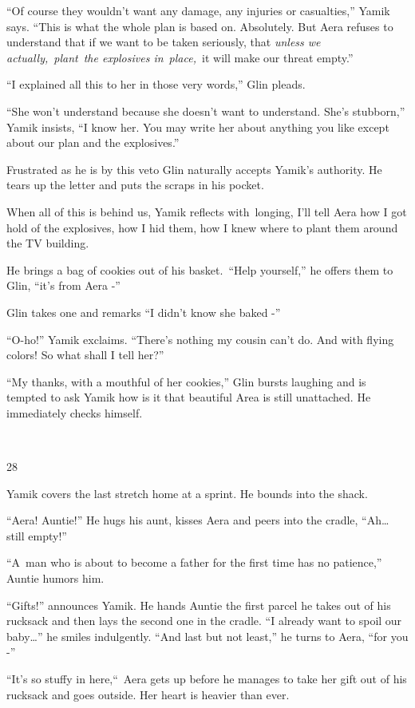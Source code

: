 \documentclass[twoside,11pt]{book}
\begin{document}
``Of course they wouldn't want any damage, any injuries or casualties,'' Yamik says.
``This is what the whole plan is based on. Absolutely. But Aera refuses to understand that if we want to
be taken seriously, that \textit{unless we actually,}\ \textit{plant}\ \textit{the explosives in}\ \textit{place,\ }it
will make our threat empty.'' \ 

``I explained all this to her in those very words,'' Glin pleads. 

``She won't understand because she doesn't want to understand. She's stubborn,'' Yamik insists, ``I know
her. You may write her about anything you like except about our plan and the explosives.'' 

Frustrated as he is by this veto Glin naturally accepts Yamik's authority. He tears up the letter and puts the scraps in
his pocket. 

When all of this is behind us, Yamik reflects with~longing, I'll tell Aera how I got hold of the explosives, how I hid
them, how I knew where to plant them around the TV building.

He brings a bag of cookies out of his basket.\ ``Help yourself,'' he offers them to Glin,
``it's from Aera -'' 

Glin takes one and remarks ``I didn't know she baked -''

``O-ho!'' Yamik exclaims. ``There's nothing my cousin can't do. And with flying
colors! So what shall I tell her?'' 

``My thanks, with a mouthful of her cookies,'' Glin bursts laughing and is tempted to ask
Yamik how is it that beautiful Area is still unattached. He immediately checks himself.

~

28~~~~~~~~~~~~~ 

Yamik covers the last stretch home at a sprint. He bounds into the shack. 

``Aera! Auntie!'' He hugs his aunt, kisses Aera and peers into the cradle,
``Ah{\dots} still empty!'' 

``A~man who is about to become a father for the first time has no patience,'' Auntie humors
him. 

``Gifts!'' announces Yamik. He hands Auntie the first parcel he takes out of his rucksack and
then lays the second one in the cradle. ``I already want to spoil our baby{\dots}'' he smiles indulgently.
``And last but not least,'' he turns to Aera, ``for you -''

``It's so stuffy in here,``~Aera gets up before he manages to take her gift out of his
rucksack and goes outside. Her heart is heavier than ever.
\end{document}
